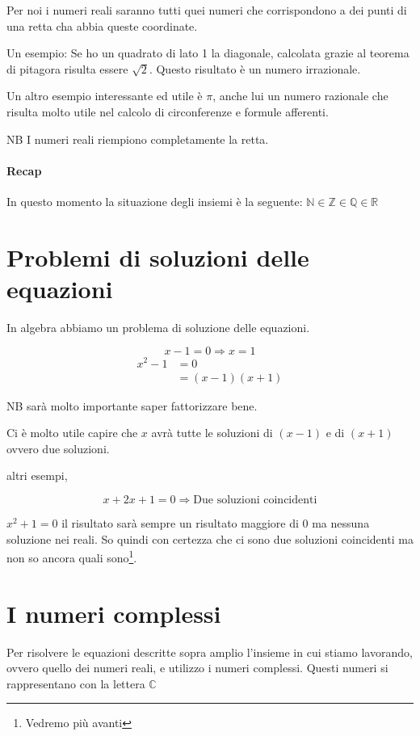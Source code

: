 Per noi i numeri reali saranno tutti quei numeri che corrispondono a dei punti di una retta cha abbia queste coordinate.


Un esempio: Se ho un quadrato di lato 1 la diagonale, calcolata grazie al teorema di pitagora risulta essere $\sqrt{2}$. Questo risultato è un numero irrazionale.

Un altro esempio interessante ed utile è $\pi$, anche lui un numero razionale che risulta molto utile nel calcolo di circonferenze e formule afferenti.

NB I numeri reali riempiono completamente la retta.

\paragraph{Recap}
In questo momento la situazione degli insiemi è la seguente: $ \mathbb{N} \in \mathbb{Z} \in \mathbb{Q} \in \mathbb{R}$

\section{Problemi di soluzioni delle equazioni}

In algebra abbiamo un problema di soluzione delle equazioni.

\[ x-1 = 0 \Rightarrow x = 1 \]
\begin{align*}
    x^2 -1 &= 0 \\
    &= (x-1)(x+1)
\end{align*}

NB sarà molto importante saper fattorizzare bene.

Ci è molto utile capire che $x$ avrà tutte le soluzioni di $(x-1)$ e di $(x+1)$ ovvero due soluzioni.

altri esempi,

\[ x+2x+1 = 0 \Rightarrow \text{Due soluzioni coincidenti}\]

$x^2 +1  = 0 $ il risultato sarà sempre un risultato maggiore di $0$ ma nessuna soluzione nei reali. So quindi con certezza che ci sono due soluzioni coincidenti ma non so ancora quali sono\footnote{Vedremo più avanti}.

\section{I numeri complessi}

Per risolvere le equazioni descritte sopra amplio l'insieme in cui stiamo lavorando, ovvero quello dei numeri reali, e utilizzo i numeri complessi. Questi numeri si rappresentano con la lettera $\mathbb{C}$

